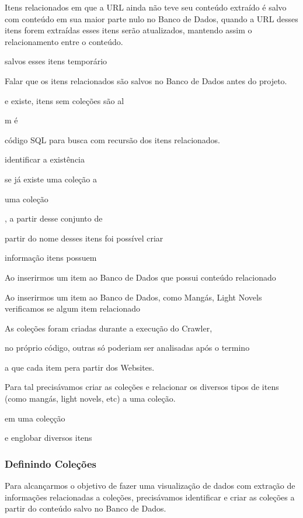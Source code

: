 \documentclass[12pt]{article}
\begin{document}
Itens relacionados em que a URL ainda não teve seu conteúdo extraído é salvo com conteúdo em sua maior parte nulo no Banco de Dados, quando a URL desses itens forem extraídas esses itens serão atualizados, mantendo assim o relacionamento entre o conteúdo.


salvos esses itens temporário


Falar que os itens relacionados são salvos no Banco de Dados antes do projeto.
 


e existe, itens sem coleções são al

m é 

código SQL para busca com recursão dos itens relacionados.


identificar a existência 

se já existe uma coleção a 

uma coleção 


, a partir desse conjunto de 

 partir do nome desses itens foi possível criar 

informação  itens possuem 

Ao inserirmos um item ao Banco de Dados que possui conteúdo relacionado 

Ao inserirmos um item ao Banco de Dados, como Mangás, Light Novels verificamos se algum item relacionado

As coleções foram criadas durante a execução do Crawler, 

 no próprio código, outras só poderiam ser analisadas após o termino 

 a que cada item pera partir dos Websites.


Para tal precisávamos criar as coleções e relacionar os diversos tipos de itens (como mangás, light novels, etc) a uma coleção.



em uma coleçção


e englobar diversos itens






\subsubsection{Definindo Coleções}

Para alcançarmos o objetivo de fazer uma visualização de dados com extração de informações relacionadas a coleções, precisávamos identificar e criar as coleções a partir do conteúdo salvo no Banco de Dados.
\end{document}
